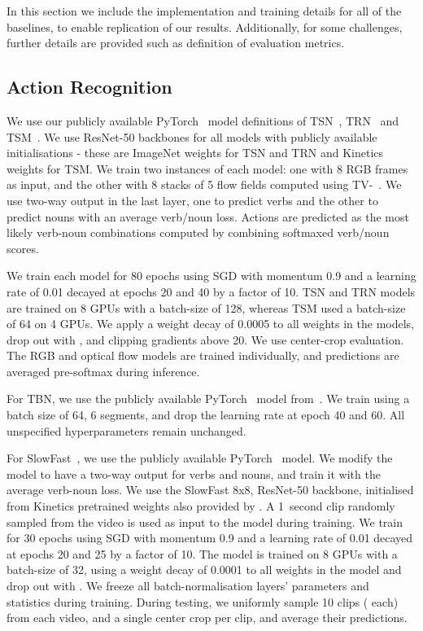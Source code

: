 \documentclass[twocolumn]{svjour3}          \smartqed
\newcommand{\chParagraph}[1]{\noindent {\textbf{#1.}} \hspace{6pt}}
\begin{document}
In this section we include the implementation and training details for all of the baselines, to enable replication of our results. Additionally, for some challenges, further details are provided such as definition of evaluation metrics.

\subsection{Action Recognition}
\label{subsec:challenge_action_recog_supp}

\chParagraph{Implementation and Training Details} 
We use our publicly available PyTorch~\cite{pytorch} model definitions of TSN~\cite{wang2016tsn}, TRN~\cite{zhou2017trn} and TSM~\cite{lin2019tsm}. 
We use ResNet-50 backbones for all models with publicly available initialisations - these are ImageNet weights for TSN and TRN and Kinetics weights for TSM.
We train two instances of each model: one with 8 RGB frames as input, and the other with 8 stacks of 5  flow fields computed using TV-~\cite{zach2007duality}.
We use two-way output in the last layer, one to predict verbs and the other to predict nouns with an average verb/noun loss.
Actions are predicted as the most likely verb-noun combinations computed by combining softmaxed verb/noun scores.

We train each model for 80 epochs using SGD with momentum 0.9 and a learning rate of 0.01 decayed at epochs 20 and 40 by a factor of 10.
TSN and TRN models are trained on 8 GPUs with a batch-size of 128, whereas TSM used a batch-size of 64 on 4 GPUs.
We apply a weight decay of 0.0005 to all weights in the models, drop out with , and clipping gradients above 20.
We use center-crop evaluation.
The RGB and optical flow models are trained individually, and predictions are averaged pre-softmax during inference.


For TBN, we use the publicly available PyTorch~\cite{pytorch} model from~\cite{kazakos2019epic}. We train using a batch size of 64, 6 segments, and drop the learning rate at epoch 40 and 60. All unspecified hyperparameters remain unchanged. 

For SlowFast~\cite{feichtenhofer2019slowfast}, we use the publicly available PyTorch~\cite{pytorch} model. We modify the model to have a two-way output for verbs and nouns, and train it with the average verb-noun loss. We use the SlowFast 8x8, ResNet-50 backbone, initialised from Kinetics pretrained weights also provided by \cite{feichtenhofer2019slowfast}. A 1~second clip randomly sampled from the video is used as input to the model during training. We train for 30 epochs using SGD with momentum 0.9 and a learning rate of 0.01 decayed at epochs 20 and 25 by a factor of 10. 
The model is trained on 8 GPUs with a batch-size of 32, using a weight decay of 0.0001 to all weights in the model and drop out with . We freeze all batch-normalisation layers' parameters and statistics during training. During testing, we uniformly sample 10 clips ( each) from each video, and a single center crop per clip, and average their predictions. 
\end{document}
